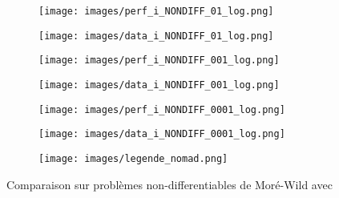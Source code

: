 	\begin{figure}[!htb] %
		\centering
		\begin{subfigure}{0.43\textwidth}
			\texttt{[image: images/perf\_i\_NONDIFF\_01\_log.png]}
		\end{subfigure}%
		\begin{subfigure}{0.43\textwidth}
			\texttt{[image: images/data\_i\_NONDIFF\_01\_log.png]}
		\end{subfigure}
		\smallskip
		\begin{subfigure}{0.43\textwidth}
			\texttt{[image: images/perf\_i\_NONDIFF\_001\_log.png]}
		\end{subfigure}%
		\begin{subfigure}{0.43\textwidth}
			\texttt{[image: images/data\_i\_NONDIFF\_001\_log.png]}
		\end{subfigure}
		\smallskip
		\begin{subfigure}{0.43\textwidth}
			\texttt{[image: images/perf\_i\_NONDIFF\_0001\_log.png]}
		\end{subfigure}%
		\begin{subfigure}{0.43\textwidth}
			\texttt{[image: images/data\_i\_NONDIFF\_0001\_log.png]}
		\end{subfigure}
		\smallskip
		\begin{subfigure}{0.95\textwidth}
			\texttt{[image: images/legende\_nomad.png]}
		\end{subfigure}
		\caption{Comparaison sur problèmes non-differentiables de Moré-Wild avec \CS} \label{fig:1}
	\end{figure}
	\clearpage
